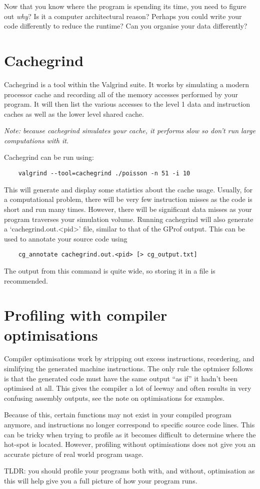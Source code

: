 \documentclass[a4paper,11pt]{article}
\begin{document}
Now that you know where the program is spending its time, you need to figure out
\emph{why}? Is it a computer architectural reason? Perhaps you could write your
code differently to reduce the runtime? Can you organise your data differently?



\section{Cachegrind}

Cachegrind is a tool within the Valgrind suite. It works by simulating a modern
processor cache and recording all of the memory accesses performed by your
program. It will then list the various accesses to the level 1 data and
instruction caches as well as the lower level shared cache.

\emph{Note: because cachegrind \emph{simulates} your cache, it performs slow so
don't run large computations with it.}

Cachegrind can be run using:

\begin{verbatim}
    valgrind --tool=cachegrind ./poisson -n 51 -i 10
\end{verbatim}

This will generate and display some statistics about the cache usage. Usually,
for a computational problem, there will be very few instruction misses as the
code is short and run many times. However, there will be significant data misses
as your program traverses your simulation volume. Running cachegrind will also
generate a `cachegrind.out.<pid>' file, similar to that of the GProf output.
This can be used to annotate your source code using

\begin{verbatim}
    cg_annotate cachegrind.out.<pid> [> cg_output.txt]
\end{verbatim}

The output from this command is quite wide, so storing it in a file is
recommended.


\section{Profiling with compiler optimisations}

Compiler optimisations work by stripping out excess instructions, reordering,
and simlifying the generated machine instructions. The only rule the optmiser
follows is that the generated code must have the same output ``as if'' it hadn't
been optimised at all. This gives the compiler a lot of leeway and often results
in very confusing assembly outputs, see the note on optimisations for examples.

Because of this, certain functions may not exist in your compiled program
anymore, and instructions no longer correspond to specific source code lines.
This can be tricky when trying to profile as it becomes difficult to determine
where the hot-spot is located. However, profiling without optimisations does not
give you an accurate picture of real world program usage. 

TLDR: you should profile your programs both with, and without, optimisation
as this will help give you a full picture of how your program runs.
\end{document}
